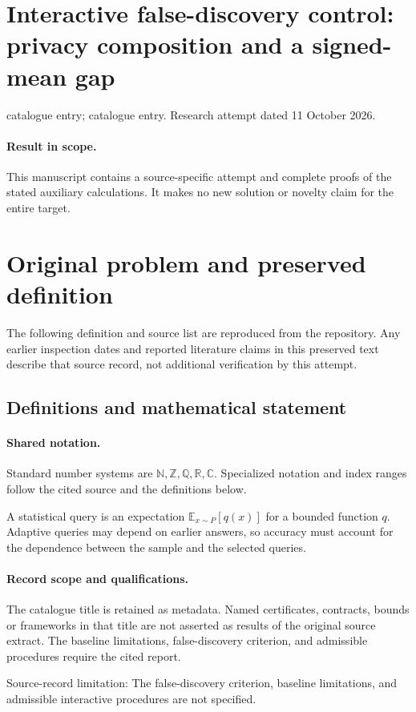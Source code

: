 \documentclass[11pt]{article}
\begin{document}
\section*{Interactive false-discovery control: privacy composition and a signed-mean gap}
\noindent catalogue entry; catalogue entry. Research attempt dated 11 October 2026.
\paragraph{Result in scope.}This manuscript contains a source-specific attempt and complete proofs of the stated auxiliary calculations. It makes no new solution or novelty claim for the entire target.
\section{Original problem and preserved definition}
The following definition and source list are reproduced from the repository. Any earlier inspection dates and reported literature claims in this preserved text describe that source record, not additional verification by this attempt.
\subsection{Definitions and mathematical statement}

\paragraph{Shared notation.}Standard number systems are $\mathbb N,\mathbb Z,\mathbb Q,\mathbb R,\mathbb C$. Specialized notation and index ranges follow the cited source and the definitions below.


A statistical query is an expectation $\mathbb E_{x\sim P}[q(x)]$ for a bounded function $q$. Adaptive queries may depend on earlier answers, so accuracy must account for the dependence between the sample and the selected queries.
\paragraph{Record scope and qualifications.}
The catalogue title is retained as metadata. Named certificates, contracts, bounds or frameworks in that title are not asserted as results of the original source extract.
The baseline limitations, false-discovery criterion, and admissible procedures require the cited report.

Source-record limitation: The false-discovery criterion, baseline limitations, and admissible interactive procedures are not specified.
\end{document}
